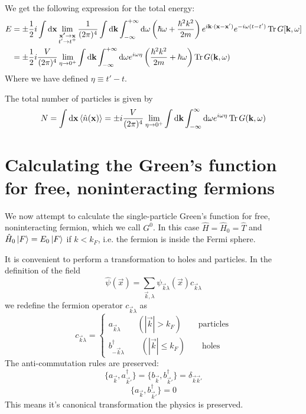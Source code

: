 We get the following expression for the total energy:
\begin{align*}
E &= \pm \frac{1}{2}i \int \operatorname{d \!}{\bm{\mathrm{x}}}\lim_{\substack{\bm{\mathrm{x'}} \to \bm{\mathrm{x}} \\ t'\to t^+}} \frac{1}{(2\pi)^4}\int \operatorname{d \!}{\bm{\mathrm{k}}}\int^{+\infty}_{-\infty}\operatorname{d \!}{\omega}\left(\hbar\omega + \frac{\hbar^2k^2}{2m}\right)e^{i \bm{\mathrm{k}}\cdot(\bm{\mathrm{x}} - \bm{\mathrm{x}}')}e^{-i\omega(t-t')} \operatorname{Tr} G[\bm{\mathrm{k}},\omega] \\ 
&= \pm \frac{1}{2}i \frac{V}{(2\pi)^4}\lim_{\eta\to 0^+} \int \operatorname{d \!}{\bm{\mathrm{k}}} \int^{+\infty}_{-\infty} \operatorname{d \!}{\omega}e^{i\omega\eta} \left(\frac{\hbar^2k^2}{2m}+ \hbar \omega\right)\operatorname{Tr} G(\bm{\mathrm{k}},\omega)
\end{align*}
Where we have defined $\eta \equiv t'-t$.

The total number of particles is given by
\[ N = \int \operatorname{d \!}{\bm{\mathrm{x}}}\left\langle \hat{n}(\bm{\mathrm{x}}) \right\rangle = \pm i \frac{V}{(2\pi)^4}\lim_{\eta\to0^+}\int \operatorname{d \!}{\bm{\mathrm{k}}}\int^\infty_{-\infty}\operatorname{d \!}{\omega}e^{i\omega \eta}\operatorname{Tr} G(\bm{\mathrm{k}},\omega) \]

\section{Calculating the Green's function for free, noninteracting fermions}
We now attempt to calculate the single-particle Green's function for free, noninteracting fermion, which we call $G^0$. In this case $\hat{H} = \hat{H}_0 = \hat{T}$ and $\hat{H}_0\left| F \right\rangle = E_0\left| F \right\rangle$ if $k < k_F$, i.e. the fermion is inside the Fermi sphere.

It is convenient to perform a transformation to holes and particles. In the definition of the field
\[ \hat{\psi}(\vec{x}) = \sum_{\vec{k},\lambda}\psi_{\vec{k}\lambda}(\vec{x})c_{\vec{k}\lambda} \]
we redefine the fermion operator $c_{\vec{k}\lambda}$ as
\[ c_{\vec{k}\lambda} = \begin{cases}
a_{\vec{k}\lambda} \qquad (|\vec{k}|> k_F) \qquad \text{particles} \\
b^\dagger_{- \vec{k}\lambda} \qquad (|\vec{k}| \leq k_F) \qquad \text{holes}
\end{cases} \] 
The anti-commutation rules are preserved:
\[ \{a_{\vec{k}}, a^\dagger_{\vec{k}'}\} = \{b_{\vec{k}}, b^\dagger_{\vec{k}'}\} = \delta_{\vec{k} \vec{k}'} \]
\[ \{a_{\vec{k}} , b^\dagger_{\vec{k}'}\} = 0 \]
This means it's canonical transformation the physics is preserved.

